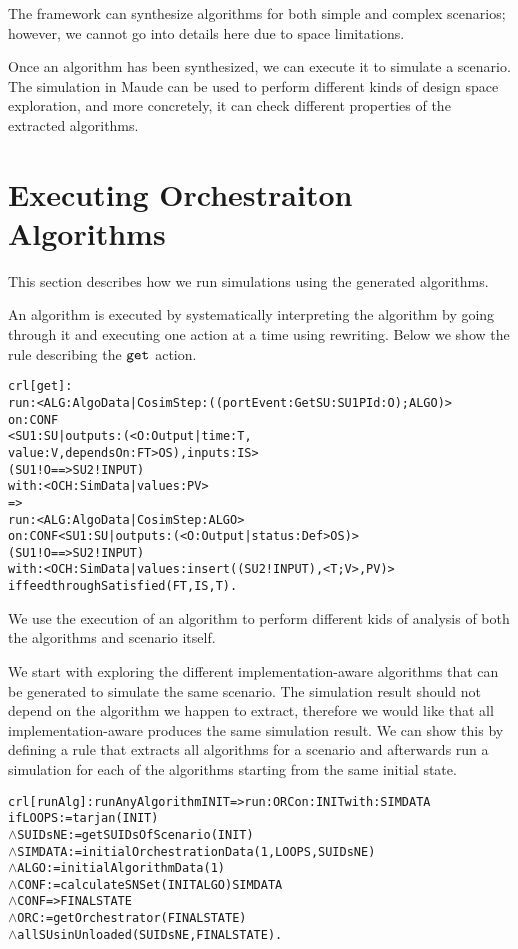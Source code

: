 The framework can synthesize algorithms for both simple and complex scenarios; however, we cannot go into details here due to space limitations.

Once an algorithm has been synthesized, we can execute it to simulate a scenario.
The simulation in Maude can be used to perform different kinds of design space exploration, and more concretely, it can check different properties of the extracted algorithms.

\section{Executing Orchestraiton Algorithms}
This section describes how we run simulations using the generated algorithms.

An algorithm is executed by systematically interpreting the algorithm by going through it and executing one action at a time using rewriting.
Below we show the rule describing the $\mathtt{get}_{}$ action.
\begin{alltt}
\small
crl [get] : 
run: < ALG : AlgoData | CosimStep : ((portEvent: Get SU: SU1 PId: O) ; ALGO) >
on: CONF
    < SU1 : SU | outputs : (< O : Output | time : T, 
value : V, dependsOn : FT > OS), inputs : IS > 
    ( SU1 ! O ==> SU2 ! INPUT)
with: < OCH : SimData | values : PV >
=> 
run: < ALG : AlgoData | CosimStep : ALGO >
on: CONF < SU1 : SU | outputs : (< O : Output | status : Def > OS) > 
            ( SU1 ! O ==> SU2 ! INPUT)
with: < OCH : SimData | values : insert((SU2 ! INPUT), < T ; V >, PV) > 
if feedthroughSatisfied(FT, IS, T) .
\end{alltt}

We use the execution of an algorithm to perform different kids of analysis of both the algorithms and scenario itself.

We start with exploring the different implementation-aware algorithms that can be generated to simulate the same scenario.
The simulation result should not depend on the algorithm we happen to extract, therefore we would like that all implementation-aware produces the same simulation result.
We can show this by defining a rule that extracts all algorithms for a scenario and afterwards run a simulation for each of the algorithms starting from the same initial state.

\begin{alltt}
  \small
crl [runAlg] : runAnyAlgorithm INIT => run: ORC on: INIT with: SIMDATA
  if LOOPS := tarjan(INIT)
  \(\land\) SUIDsNE := getSUIDsOfScenario(INIT)
  \(\land\) SIMDATA := initialOrchestrationData(1,LOOPS,SUIDsNE)
  \(\land\) ALGO := initialAlgorithmData(1)
  \(\land\) CONF := calculateSNSet(INIT ALGO) SIMDATA 
  \(\land\) {CONF} => { FINALSTATE } 
  \(\land\) ORC := getOrchestrator(FINALSTATE)
  \(\land\) allSUsinUnloaded(SUIDsNE, FINALSTATE) .
\end{alltt}

